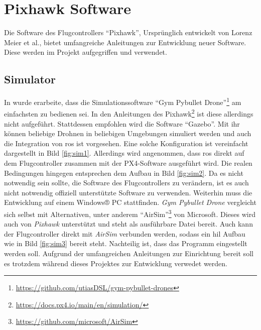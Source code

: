 \section{Pixhawk Software}
Die Software des Flugcontrollers \enquote{Pixhawk}, Ursprünglich entwickelt von Lorenz Meier et al., bietet umfangreiche Anleitungen zur Entwicklung neuer Software. Diese werden im Projekt aufgegriffen und verwendet.
\subsection{Simulator}
In \cite[Kapitel 6.5]{wirthErweiterungBestehendenDrohne2022a} wurde erarbeite, dass die Simulationssoftware \enquote{Gym Pybullet Drone}\footnote{\url{https://github.com/utiasDSL/gym-pybullet-drones}\cite{paneratiLearningFlyGym2021}} am einfachsten zu bedienen sei. In den Anleitungen des Pixhawk\footnote{\url{https://docs.px4.io/main/en/simulation/}}\cite{dronecodestiftungPX4UserGuide} ist diese allerdings nicht aufgeführt. Stattdessen empfohlen wird die Software \enquote{Gazebo}. Mit ihr können beliebige Drohnen in beliebigen Umgebungen simuliert werden und auch die Integration von \gls{ros} ist vorgesehen. Eine solche Konfiguration ist vereinfacht dargestellt in Bild \ref{fig:sim1}. Allerdings wird angenommen, dass \gls{ros} direkt auf dem Flugcontroller zusammen mit der PX4-Software ausgeführt wird. Die realen Bedingungen hingegen entsprechen dem Aufbau in Bild \ref{fig:sim2}. Da es nicht notwendig sein sollte, die Software des Flugcontrollers zu verändern, ist es auch nicht notwendig offiziell unterstützte Software zu verwenden. Weiterhin muss die Entwicklung auf einem Windows® PC stattfinden. \textit{Gym Pybullet Drone} vergleicht sich selbst mit Alternativen, unter anderem \enquote{AirSim}\footnote{\url{https://github.com/microsoft/AirSim}\cite{WelcomeAirSim2023}} von Microsoft. Dieses wird auch von \textit{Pixhawk} unterstützt und steht als ausführbare Datei bereit. Auch kann der Flugcontroller direkt mit \textit{AirSim} verbunden werden, sodass ein \gls{hil} Aufbau wie in Bild \ref{fig:sim3} bereit steht. Nachteilig ist, dass das Programm eingestellt werden soll. Aufgrund der umfangreichen Anleitungen zur Einrichtung bereit\cite[siehe \enquote*{documentation}]{WelcomeAirSim2023} soll es trotzdem während dieses Projektes zur Entwicklung verwedet werden.

